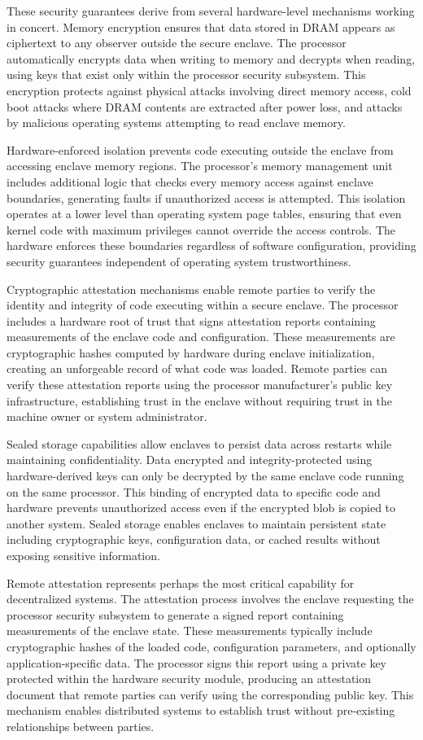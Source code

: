These security guarantees derive from several hardware-level mechanisms working in concert. Memory encryption ensures that data stored in DRAM appears as ciphertext to any observer outside the secure enclave. The processor automatically encrypts data when writing to memory and decrypts when reading, using keys that exist only within the processor security subsystem. This encryption protects against physical attacks involving direct memory access, cold boot attacks where DRAM contents are extracted after power loss, and attacks by malicious operating systems attempting to read enclave memory.

Hardware-enforced isolation prevents code executing outside the enclave from accessing enclave memory regions. The processor's memory management unit includes additional logic that checks every memory access against enclave boundaries, generating faults if unauthorized access is attempted. This isolation operates at a lower level than operating system page tables, ensuring that even kernel code with maximum privileges cannot override the access controls. The hardware enforces these boundaries regardless of software configuration, providing security guarantees independent of operating system trustworthiness.

Cryptographic attestation mechanisms enable remote parties to verify the identity and integrity of code executing within a secure enclave. The processor includes a hardware root of trust that signs attestation reports containing measurements of the enclave code and configuration. These measurements are cryptographic hashes computed by hardware during enclave initialization, creating an unforgeable record of what code was loaded. Remote parties can verify these attestation reports using the processor manufacturer's public key infrastructure, establishing trust in the enclave without requiring trust in the machine owner or system administrator.

Sealed storage capabilities allow enclaves to persist data across restarts while maintaining confidentiality. Data encrypted and integrity-protected using hardware-derived keys can only be decrypted by the same enclave code running on the same processor. This binding of encrypted data to specific code and hardware prevents unauthorized access even if the encrypted blob is copied to another system. Sealed storage enables enclaves to maintain persistent state including cryptographic keys, configuration data, or cached results without exposing sensitive information.

Remote attestation represents perhaps the most critical capability for decentralized systems. The attestation process involves the enclave requesting the processor security subsystem to generate a signed report containing measurements of the enclave state. These measurements typically include cryptographic hashes of the loaded code, configuration parameters, and optionally application-specific data. The processor signs this report using a private key protected within the hardware security module, producing an attestation document that remote parties can verify using the corresponding public key. This mechanism enables distributed systems to establish trust without pre-existing relationships between parties.

